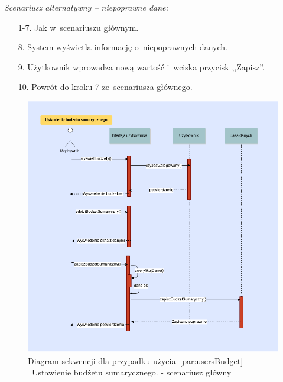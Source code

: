 \textit{Scenariusz alternatywny -- niepoprawne dane:}
\begin{enumerate}
  \item[1-7.] Jak w~scenariuszu głównym.
  \item[8.] System wyświetla informację o~niepoprawnych danych.
  \item[9.] Użytkownik wprowadza nową wartość i~wciska przycisk ,,Zapisz''.
  \item[10.] Powrót do kroku 7 ze~scenariusza głównego.
\end{enumerate}

\begin{figure}[H]
    \includegraphics[width=\textwidth,
    height=0.5\textheight]{images/modyfikacja_budzetu_sumarycznego.png}
    \caption{Diagram sekwencji dla przypadku użycia~\ref{par:usersBudget}~--~Ustawienie budżetu sumarycznego.
    - scenariusz główny}
\end{figure}

